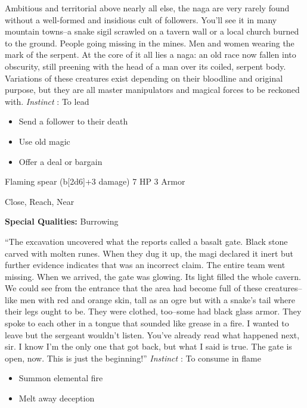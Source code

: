  Ambitious and territorial above nearly all else, the naga are very rarely found without a well-formed and insidious cult of followers. You'll see it in many mountain towns--a snake sigil scrawled on a tavern wall or a local church burned to the ground. People going missing in the mines. Men and women wearing the mark of the serpent. At the core of it all lies a naga: an old race now fallen into obscurity, still preening with the head of a man over its coiled, serpent body. Variations of these creatures exist depending on their bloodline and original purpose, but they are all master manipulators and magical forces to be reckoned with. \emph{Instinct}
: To lead
\begin{itemize}
\item Send a follower to their death
\item Use old magic
\item Offer a deal or bargain

\end{itemize}




 Flaming spear (b[2d6]+3 damage) 7 HP 3 Armor


 Close, Reach, Near


 \textbf{Special Qualities:}
 Burrowing


 ``The excavation uncovered what the reports called a basalt gate. Black stone carved with molten runes. When they dug it up, the magi declared it inert but further evidence indicates that was an incorrect claim. The entire team went missing. When we arrived, the gate was glowing. Its light filled the whole cavern. We could see from the entrance that the area had become full of these creatures--like men with red and orange skin, tall as an ogre but with a snake's tail where their legs ought to be. They were clothed, too--some had black glass armor. They spoke to each other in a tongue that sounded like grease in a fire. I wanted to leave but the sergeant wouldn't listen. You've already read what happened next, sir. I know I'm the only one that got back, but what I said is true. The gate is open, now. This is just the beginning!'' \emph{Instinct}
: To consume in flame
\begin{itemize}
\item Summon elemental fire
\item Melt away deception

\end{itemize}


